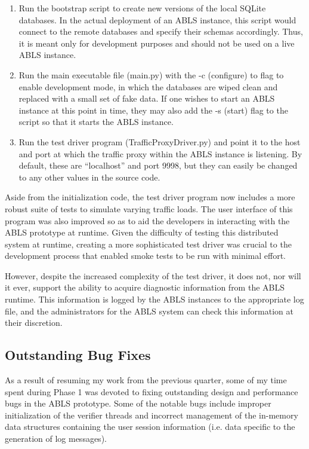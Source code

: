 \documentclass{sig-alternate}
\begin{document}
\begin{enumerate}
	\item Run the bootstrap script to create new versions of the local SQLite databases. In the actual deployment of an ABLS instance, this script would connect to the remote databases and specify their schemas accordingly. Thus, it is meant only for development purposes and should not be used on a live ABLS instance.
	\item Run the main executable file (main.py) with the -c (configure) to flag to enable development mode, in which the databases are wiped clean and replaced with a small set of fake data. If one wishes to start an ABLS instance at this point in time, they may also add the -s (start) flag to the script so that it starts the ABLS instance.
	\item Run the test driver program (TrafficProxyDriver.py) and point it to the host and port at which the traffic proxy within the ABLS instance is listening. By default, these are ``localhost'' and port 9998, but they can easily be changed to any other values in the source code. 
\end{enumerate}

Aside from the initialization code, the test driver program now includes a more robust suite of tests to simulate varying traffic 
loads. The user interface of this program was also improved so as to aid the developers in interacting with the ABLS 
prototype at runtime. Given the difficulty of testing this distributed system at runtime, creating a more sophisticated
test driver was crucial to the development process that enabled smoke tests to be run with minimal effort.

However, despite the increased complexity of the test driver, it does not, nor will it ever, support the ability to acquire 
diagnostic information from the ABLS runtime. This information is logged by the ABLS instances to the appropriate log 
file, and the administrators for the ABLS system can check this information at their discretion.

\subsection{Outstanding Bug Fixes}
As a result of resuming my work from the previous quarter, some of my time spent during Phase 1 was devoted to fixing
outstanding design and performance bugs in the ABLS prototype. Some of the notable bugs include improper 
initialization of the verifier threads and incorrect management of the in-memory data structures containing the 
user session information (i.e. data specific to the generation of log messages).
\end{document}
